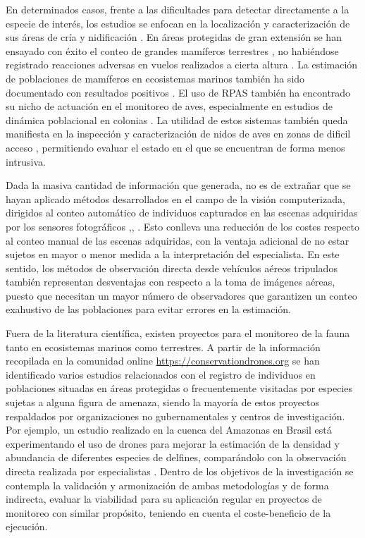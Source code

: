 \documentclass[11pt,]{article}
\begin{document}
En determinados casos, frente a las dificultades para detectar
directamente a la especie de interés, los estudios se enfocan en la
localización y caracterización de sus áreas de cría y nidificación
\citep{VanAndel2015}. En áreas protegidas de gran extensión se han
ensayado con éxito el conteo de grandes mamíferos terrestres , no
habiéndose registrado reacciones adversas en vuelos realizados a cierta
altura \citep{Vermeulen2013}. La estimación de poblaciones de mamíferos
en ecosistemas marinos también ha sido documentado con resultados
positivos \citep{Hodgson2013}. El uso de RPAS también ha encontrado su
nicho de actuación en el monitoreo de aves, especialmente en estudios de
dinámica poblacional en colonias \citep{Sarda-Palomera2012}. La utilidad
de estos sistemas también queda manifiesta en la inspección y
caracterización de nidos de aves en zonas de dificil acceso
\citep{Weissensteiner2015}, permitiendo evaluar el estado en el que se
encuentran de forma menos intrusiva.

Dada la masiva cantidad de información que generada, no es de extrañar
que se hayan aplicado métodos desarrollados en el campo de la visión
computerizada, dirigidos al conteo automático de individuos capturados
en las escenas adquiridas por los sensores fotográficos
\citep{Lhoest2015},\citep{Abd-Elrahman2005a}, \citep{VanGemert2015}.
Esto conlleva una reducción de los costes respecto al conteo manual de
las escenas adquiridas, con la ventaja adicional de no estar sujetos en
mayor o menor medida a la interpretación del especialista. En este
sentido, los métodos de observación directa desde vehículos aéreos
tripulados también representan desventajas con respecto a la toma de
imágenes aéreas, puesto que necesitan un mayor número de observadores
que garantizen un conteo exahustivo de las poblaciones para evitar
errores en la estimación.

Fuera de la literatura científica, existen proyectos para el monitoreo
de la fauna tanto en ecosistemas marinos como terrestres. A partir de la
información recopilada en la comunidad online
\url{https://conservationdrones.org} se han identificado varios estudios
relacionados con el registro de individuos en poblaciones situadas en
áreas protegidas o frecuentemente visitadas por especies sujetas a
alguna figura de amenaza, siendo la mayoría de estos proyectos
respaldados por organizaciones no gubernamentales y centros de
investigación. Por ejemplo, un estudio realizado en la cuenca del
Amazonas en Brasil está experimentando el uso de drones para mejorar la
estimación de la densidad y abundancia de diferentes especies de
delfines, comparándolo con la observación directa realizada por
especialistas \citep{WichS2017}. Dentro de los objetivos de la
investigación se contempla la validación y armonización de ambas
metodologías y de forma indirecta, evaluar la viabilidad para su
aplicación regular en proyectos de monitoreo con similar propósito,
teniendo en cuenta el coste-beneficio de la ejecución.
\end{document}
